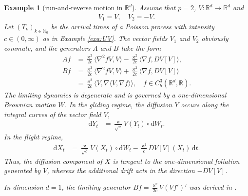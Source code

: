\documentclass[10pt]{article}
\newcommand{\1}{1\!\!\!\;{\rm I}}
\theoremstyle{plain}
\newtheorem{exa}[thm]{Example}
\theoremstyle{definition}
\newcommand{\ba}{\begin{equation}\begin{aligned}}
\newcommand{\ea}{\end{aligned}\end{equation}}
\newcommand{\di}{\mathrm{d}}
\newcommand{\bR}{\mathbb{R}}
\numberwithin{equation}{section}
\begin{document}
\begin{exa}[run-and-reverse motion in $\bR^d$]
\label{exa:rr}
Assume that $p=2$, $V\colon \bR^d\to\bR^d$ and
\ba
V_1=V,\quad V_2=-V.
\ea
Let $(T_k)_{k\in\mathbb N_0}$ be the arrival times of a Poisson process with intensity $c\in (0,\infty)$ as in Example \ref{exa:UV}.
The vector fields $V_1$ and $V_2$ obviously commute, and the generators $A$ and $B$ take the form
\ba
Af
&= \frac{\varkappa^2}{2c}  \langle \nabla^2 f  V, V\rangle
- \frac{\varkappa^2}{2c}\langle \nabla f , D V [ V] \rangle,\\
Bf
&=\frac{\varkappa^2}{2c} \langle \nabla^2 f V ,V\rangle
+ \frac{\varkappa^2}{2c}  \langle \nabla f , D V [ V] \rangle\\
&=\frac{\varkappa^2}{2c}  \langle V , \nabla \langle V,\nabla f\rangle\rangle
 ,\quad f\in C^3_b(\bR^d,\bR).
\ea
The limiting dynamics is degenerate and is governed by a one-dimensional Brownian motion $W$.
In the gliding regime, the diffusion $Y$ occurs along the integral curves of the vector field $V$,
\ba
\di Y_t&= \frac{\varkappa}{\sqrt c} V (Y_t)\circ \di W_t.
\ea
In the flight regime,
\ba
\di X_t&=
\frac{\varkappa}{\sqrt c}  V (X_t)\circ \di W_t - \frac{\varkappa^2}{c} D V [ V](X_t)\,\di t.
\ea
Thus, the diffusion component of $X$ is tangent to the one-dimensional foliation generated by $V$,
whereas the additional drift acts in the direction $-DV[V]$.

In dimension $d=1$, the limiting generator
$Bf=\frac{\varkappa^2}{2c} V(Vf')'$ was derived in \cite[Theorem 5.1]{ratanov1999telegraph}.
\end{exa}
\end{document}
